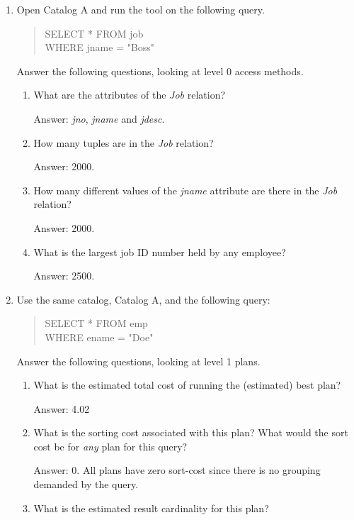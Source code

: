 \begin{enumerate}
\item
Open Catalog A and run the tool on the following query.  
\begin{quote}
        SELECT * FROM job\\
        WHERE jname = "Boss"
\end{quote}

Answer the following questions, looking at level 0 access methods.
\begin{enumerate}
\item
What are the attributes of the {\em Job} relation?

Answer: {\em jno}, {\em jname} and {\em jdesc}.

\item
How many tuples are in the {\em Job} relation?

Answer: 2000.

\item
How many different values of the {\em jname} attribute are there in
the {\em Job} relation?

Answer: 2000.

\item
What is the largest job ID number held by any employee?

Answer: 2500.
\end{enumerate}


\item
Use the same catalog, Catalog A, and the following query:
\begin{quote}
        SELECT * FROM emp\\
        WHERE ename = "Doe"
\end{quote}

Answer the following questions, looking at level 1 plans.
\begin{enumerate}
\item
What is the estimated total cost of running the (estimated) best plan?

Answer: 4.02

\item
What is the sorting cost associated with this plan?  What would the sort
cost be for {\em any} plan for this query?

Answer: 0. All plans have zero sort-cost since there is no grouping
demanded by the query.

\item
What is the estimated result cardinality for this plan?


\end{enumerate}
\end{enumerate}
